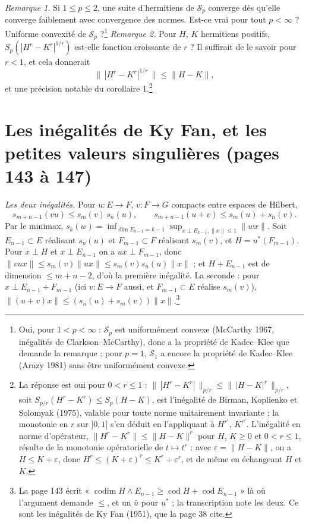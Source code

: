 \documentclass[11pt,a4paper]{article}
\begin{document}
\emph{Remarque 1.} Si $1 \leq p \leq 2$, une suite d'hermitiens de
$\mathcal{S}_p$ converge dès qu'elle converge faiblement avec convergence
des normes. Est-ce vrai pour tout $p < \infty$ ? Uniforme convexité de
$\mathcal{S}_p$ ?\footnote{Oui, pour $1 < p < \infty$ : $\mathcal{S}_p$ est
uniformément convexe (McCarthy 1967, inégalités de Clarkson--McCarthy),
donc a la propriété de Kadec--Klee que demande la remarque ; pour $p = 1$,
$\mathcal{S}_1$ a encore la propriété de Kadec--Klee (Arazy 1981) sans être
uniformément convexe.}
\emph{Remarque 2.} Pour $H$, $K$ hermitiens positifs, $S_p(|H^r - K^r|^{1/r})$
est-elle fonction croissante de $r$ ? Il suffirait de le savoir pour $r <
1$, et cela donnerait
\[
  \bigl\|\,|H^r - K^r|^{1/r}\,\bigr\| \leq \|H - K\| ,
\]
et une précision notable du corollaire 1.\footnote{La réponse est oui pour
$0 < r \leq 1$ : $\|\,|H^r - K^r|\,\|_{p/r} \leq \|\,|H - K|^r\,\|_{p/r}$, soit
$S_{p/r}(H^r - K^r) \leq S_p(H - K)$, est l'inégalité de Birman, Koplienko et
Solomyak (1975), valable pour toute norme unitairement invariante ; la
monotonie en $r$ sur $]0, 1]$ s'en déduit en l'appliquant à $H^{r'}$,
$K^{r'}$. L'inégalité en norme d'opérateur, $\|H^r - K^r\| \leq \|H -
K\|^r$ pour $H$, $K \geq 0$ et $0 < r \leq 1$, résulte de la monotonie
opératorielle de $t \mapsto t^r$ : avec $\varepsilon = \|H - K\|$, on a $H
\leq K + \varepsilon$, donc $H^r \leq (K + \varepsilon)^r \leq K^r +
\varepsilon^r$, et de même en échangeant $H$ et $K$.}

\section*{Les inégalités de Ky Fan, et les petites valeurs singulières (pages 143 à 147)}

\emph{Les deux inégalités.} Pour $u : E \to F$, $v : F \to G$ compacts entre
espaces de Hilbert,
\[
  s_{m+n-1}(vu) \leq s_m(v)\,s_n(u), \qquad s_{m+n-1}(u+v) \leq s_m(u) + s_n(v) .
\]
Par le minimax, $s_k(w) = \inf_{\dim E_{k-1} = k-1}\sup_{x \perp E_{k-1}, \|x\|
\leq 1}\|wx\|$. Soit $E_{n-1} \subset E$ réalisant $s_n(u)$ et $F_{m-1}
\subset F$ réalisant $s_m(v)$, et $H = u^{*}(F_{m-1})$. Pour $x \perp H$ et
$x \perp E_{n-1}$ on a $ux \perp F_{m-1}$, donc $\|vux\| \leq s_m(v)\|ux\|
\leq s_m(v)s_n(u)\|x\|$ ; et $H + E_{n-1}$ est de dimension $\leq m + n - 2$,
d'où la première inégalité. La seconde : pour $x \perp E_{n-1} + F_{m-1}$
(ici $v : E \to F$ aussi, et $F_{m-1} \subset E$ réalise $s_m(v)$),
$\|(u+v)x\| \leq (s_n(u) + s_m(v))\|x\|$.\footnote{La page 143 écrit
« $\operatorname{codim} H \wedge E_{n-1} \geq \operatorname{cod} H +
\operatorname{cod} E_{n-1}$ » là où l'argument demande $\leq$, et un $\bar{u}$
pour $u^{*}$ ; la transcription note les deux. Ce sont les inégalités de
Ky Fan (1951), que la page 38 cite.}
\end{document}
